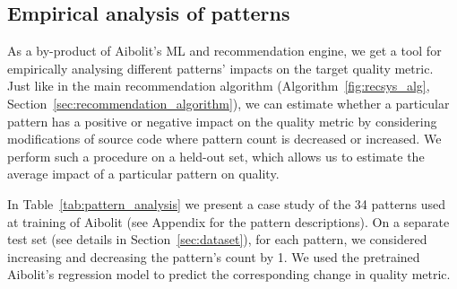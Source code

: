 
\subsection{Empirical analysis of patterns}

As a by-product of Aibolit's ML and recommendation
engine, we get a tool for empirically analysing different patterns' impacts on the target quality metric. Just
like in the main recommendation algorithm (Algorithm~\ref{fig:recsys_alg}, Section~\ref{sec:recommendation_algorithm}), we can estimate whether a particular pattern has a positive or negative impact on the quality metric by considering modifications of source code where pattern count is decreased or increased. We perform such a procedure on a held-out set, which allows us to estimate the average impact of a particular pattern on quality.

In Table~\ref{tab:pattern_analysis} we present a case study of the 34 patterns used at training of Aibolit (see Appendix for the pattern descriptions). On a separate test set (see details in Section~\ref{sec:dataset}), for each pattern, we considered increasing and decreasing the pattern's count by 1. We used the pretrained Aibolit's regression model to predict the corresponding change in quality metric.


